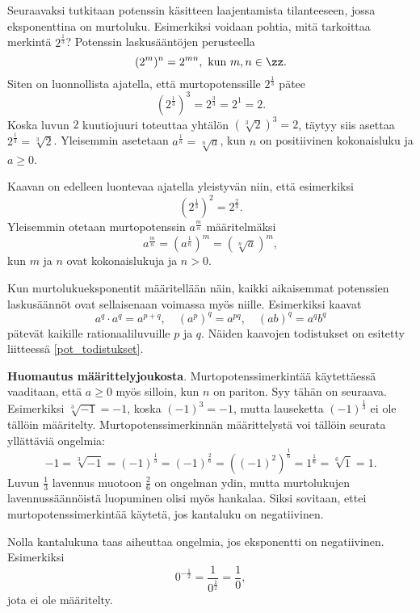 Seuraavaksi tutkitaan potenssin käsitteen laajentamista tilanteeseen, jossa eksponenttina on murtoluku.
Esimerkiksi voidaan pohtia, mitä tarkoittaa merkintä $2^\frac{1}{3}$? Potenssin laskusääntöjen perusteella
\[
(2^{m})^n = 2^{mn},\textrm{ kun }m,n\in \zz.
\]
Siten on luonnollista ajatella, että murtopotenssille $2^\frac{1}{3}$ pätee
\[
(2^\frac{1}{3})^3 = 2^\frac{3}{3} = 2^1=2.
\]
Koska luvun $2$ kuutiojuuri toteuttaa yhtälön $(\sqrt[3]{2})^3=2$, täytyy siis asettaa $2^\frac{1}{3}=\sqrt[3]{2}$. Yleisemmin asetetaan $a^\frac{1}{n} =\sqrt[n]{a}$, kun $n$ on positiivinen kokonaisluku ja $a\ge 0$.

Kaavan on edelleen luontevaa ajatella yleistyvän niin, että esimerkiksi
\[
(2^{\frac{1}{3}})^2 = 2^{\frac{2}{3}}.
\]
Yleisemmin otetaan murtopotenssin $a^\frac{m}{n}$ määritelmäksi
\[
a^\frac{m}{n} = (a^{\frac{1}{n}})^m = (\sqrt[n]{a})^m,
\]
kun $m$ ja $n$ ovat kokonaislukuja ja $n>0$. 



Kun murtolukueksponentit määritellään näin, kaikki aikaisemmat potenssien
laskusäännöt ovat sellaisenaan voimassa myös niille. Esimerkiksi kaavat
\[ a^q\cdot a^q = a^{p+q}, \quad (a^p)^q = a^{pq}, \quad (ab)^q=a^qb^q \]
pätevät kaikille rationaaliluvuille $p$ ja $q$.  Näiden kaavojen todistukset on esitetty liitteessä \ref{pot_todistukset}.

{\bf Huomautus määrittelyjoukosta}. Murtopotenssimerkintää käytettäessä vaaditaan, että $a\geq 0$ myös silloin, kun $n$ on pariton. Syy tähän on seuraava. Esimerkiksi $\sqrt[3]{-1}=-1$, koska $(-1)^3=-1$, mutta lauseketta $(-1)^\frac{1}{3}$ ei ole tällöin määritelty. Murtopotenssimerkinnän määrittelystä voi tällöin seurata yllättäviä ongelmia:
\[
 -1 = \sqrt[3]{-1} = (-1)^\frac{1}{3} = (-1)^\frac{2}{6}
= ((-1)^2)^\frac{1}{6} = 1^\frac{1}{6} = \sqrt[6]{1} = 1. 
\]
Luvun $\frac{1}{3}$ lavennus muotoon $\frac{2}{6}$ on ongelman ydin, mutta murtolukujen lavennussäännöistä luopuminen olisi myös hankalaa. Siksi sovitaan, ettei murtopotenssimerkintää käytetä, jos kantaluku on negatiivinen.

Nolla kantalukuna taas aiheuttaa ongelmia, jos eksponentti on negatiivinen. Esimerkiksi
\[
 0^{-\tfrac{1}{2}}=\frac{1}{0^\frac{1}{2}}=\frac{1}{0}, %
\]
jota ei ole määritelty.


